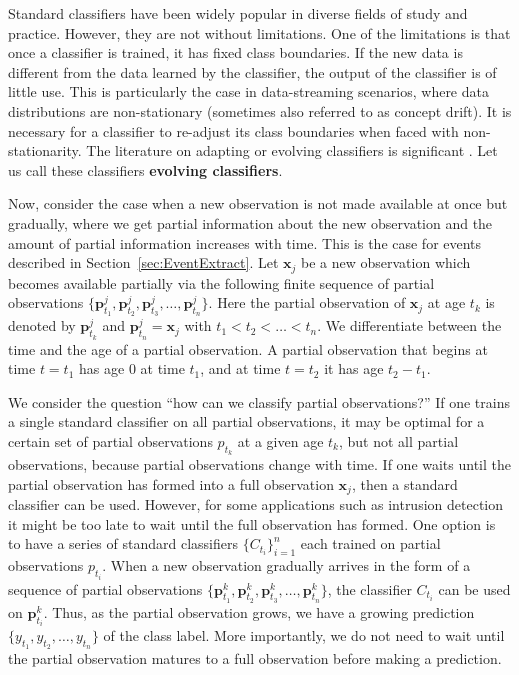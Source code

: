 \documentclass[a4paper,11pt]{article}
\begin{document}
Standard classifiers have been widely popular in diverse fields of study and practice. However, they are not without limitations. One of the limitations is that once a classifier is trained, it has fixed class boundaries. If the new data is different from the data learned by the classifier, the output of the classifier is of little use. This is particularly the case in data-streaming scenarios, where data distributions are non-stationary (sometimes also referred to as concept drift). It is necessary for a classifier to re-adjust its class boundaries when faced with non-stationarity. The literature on adapting or evolving classifiers is significant \cite{duchi2011adaptive, dabbagh2005online, frey1991letter, giacinto1997adaptive, nishida2005ace,alippi2008just, alippi2008just2}. Let us call these classifiers \textbf{evolving classifiers}.

Now, consider the case when a new observation is not made available at once but gradually, where we get partial information about the new observation and the amount of partial information increases with time. This is the case for events described in Section~\ref{sec:EventExtract}. Let $\bm{x}_j$ be a new observation which becomes available partially via the following finite sequence of partial observations $\{\bm{p}^j_{t_1},\bm{p}^j_{t_2}, \bm{p}^j_{t_3}, \dots, \bm{p}^j_{t_n}\}$. Here the partial observation of $\bm{x}_j$ at age $t_k$ is denoted by $\bm{p}^j_{t_k}$ and $\bm{p}^j_{t_n} = \bm{x}_j$ with $t_1 < t_2 < \dots < t_n$. We differentiate between the time and the age of a partial observation. A partial observation that begins at time $t =t_1$ has age $0$ at time $t_1$, and at time $t = t_2$ it has age $t_2 - t_1$.

We consider the question ``how can we classify partial observations?'' If one trains a single standard classifier on all partial observations, it may be optimal for a certain set of partial observations $p_{t_k}$ at a given age $t_k$, but not all partial observations, because partial observations change with time. If one waits until the partial observation has formed into a full observation $\bm{x}_j$, then a standard classifier can be used. However, for some applications such as intrusion detection it might be too late to wait until the full observation has formed. One option is to have a series of standard classifiers $\{C_{t_i}\}_{i=1}^n$ each trained on partial observations $p_{t_i}$. When a new observation gradually arrives in the form of a sequence of partial observations $\{\bm{p}^k_{t_1},\bm{p}^k_{t_2}, \bm{p}^k_{t_3}, \dots, \bm{p}^k_{t_n}\}$, the classifier $C_{t_i}$ can be used on $\bm{p}^k_{t_i}$. Thus, as the partial observation grows, we have a growing prediction $\{y_{t_1}, y_{t_2}, \dots, y_{t_n}\}$ of the class label. More importantly, we do not need to wait until the partial observation matures to a full observation before making a prediction. 
\end{document}
